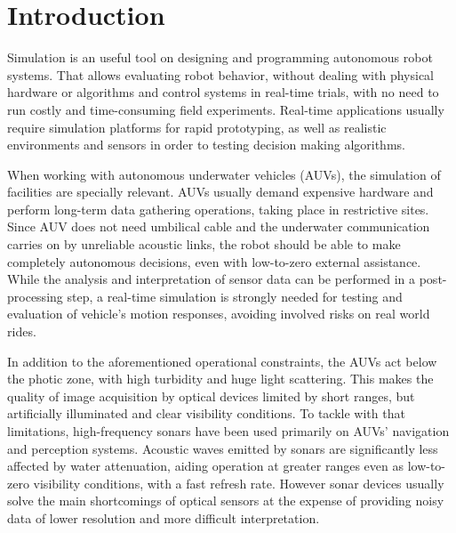 \documentclass[final,5p,times]{elsarticle}
\begin{document}
\linenumbers

\section{Introduction}
\label{introduction}

Simulation is an useful tool on designing and programming autonomous robot systems. That allows evaluating robot behavior, without dealing with physical hardware or algorithms and control systems in real-time trials, with no need to run costly and time-consuming field experiments. Real-time applications usually require simulation platforms for rapid prototyping, as well as realistic environments and sensors in order to testing decision making algorithms.

When working with autonomous underwater vehicles (AUVs), the simulation of facilities are specially relevant. AUVs usually demand expensive hardware and perform long-term data gathering operations, taking place in restrictive sites. Since AUV does not need umbilical cable and the underwater communication carries on by unreliable acoustic links, the robot should be able to make completely autonomous decisions, even with low-to-zero external assistance. While the analysis and interpretation of sensor data can be performed in a post-processing step, a real-time simulation is strongly needed for testing and evaluation of vehicle's motion responses, avoiding involved risks on real world rides.

In addition to the aforementioned operational constraints, the AUVs act below the photic zone, with high turbidity and huge light scattering. This makes the quality of image acquisition by optical devices limited by short ranges, but artificially illuminated and clear visibility conditions. To tackle with that limitations, high-frequency sonars have been used primarily on AUVs' navigation and perception systems. Acoustic waves emitted by sonars are significantly less affected by water attenuation, aiding operation at greater ranges even as low-to-zero visibility conditions, with a fast refresh rate. However sonar devices usually solve the main shortcomings of optical sensors at the expense of providing noisy data of lower resolution and more difficult interpretation.
\end{document}
